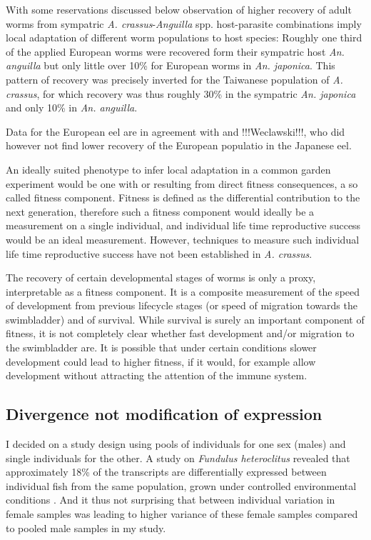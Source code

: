 With some reservations discussed below observation of higher recovery
of adult worms from sympatric \textit{A. crassus}-\textit{Anguilla}
spp. host-parasite combinations imply local adaptation of different
worm populations to host species: Roughly one third of the applied
European worms were recovered form their sympatric host
\textit{An. anguilla} but only little over 10\% for European worms in
\textit{An. japonica}. This pattern of recovery was precisely inverted
for the Taiwanese population of \textit{A. crassus}, for which
recovery was thus roughly 30\% in the sympatric \textit{An. japonica}
and only 10\% in \textit{An. anguilla}. 

Data for the European eel are in agreement with
\cite{knopf_differences_2004} and !!!Weclawski!!!, who did however not
find lower recovery of the European populatio in the Japanese eel.

An ideally suited phenotype to infer local adaptation in a common
garden experiment would be one with or resulting from direct fitness
consequences, a so called fitness component. Fitness is defined as the
differential contribution to the next generation, therefore such a
fitness component would ideally be a measurement on a single
individual, and individual life time reproductive success would be an
ideal measurement. However, techniques to measure such individual life
time reproductive success have not been established in
\textit{A. crassus}.

The recovery of certain developmental stages of worms is only a proxy,
interpretable as a fitness component. It is a composite measurement of
the speed of development from previous lifecycle stages (or speed of
migration towards the swimbladder) and of survival. While survival is
surely an important component of fitness, it is not completely clear
whether fast development and/or migration to the swimbladder are. It
is possible that under certain conditions slower development could
lead to higher fitness, if it would, for example allow development
without attracting the attention of the immune system.

\subsection{Divergence not modification of expression}
\label{sec:sample-twelve}



I decided on a study design using pools of individuals for one sex
(males) and single individuals for the other. A study on
\textit{Fundulus heteroclitus} revealed that approximately 18\% of the
transcripts are differentially expressed between individual fish from
the same population, grown under controlled environmental conditions
\cite{pmid12219088}. And it thus not surprising that between
individual variation in female samples was leading to higher variance
of these female samples compared to pooled male samples in my study.

